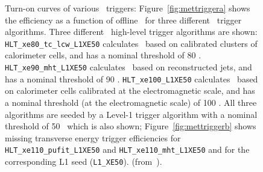 				\begin{figure}[!htb]
					\begin{center}
						\hspace{0.05\textwidth}
					\end{center}
					\caption{Turn-on curves of various \met\ triggers: Figure~\ref{fig:mettriggera} shows the efficiency as a function of offline \met\ for three different \met\ trigger algorithms. Three different \met\ high-level trigger algorithms are shown: \texttt{HLT\_xe80\_tc\_lcw\_L1XE50} calculates \met\ based on calibrated clusters of calorimeter cells, and has a nominal threshold of 80 \GeV. \texttt{HLT\_xe90\_mht\_L1XE50} calculates \met\ based on reconstructed jets, and has a nominal threshold of 90 \GeV. \texttt{HLT\_xe100\_L1XE50} calculates \met\ based on calorimeter cells calibrated at the electromagnetic scale, and has a nominal threshold (at the electromagnetic scale) of 100 \GeV. All three algorithms are seeded by a Level-1 trigger algorithm with a nominal threshold of 50 \GeV\ which is also shown; Figure~\ref{fig:mettriggerb} shows missing transverse energy trigger efficiencies for \texttt{HLT\_xe110\_pufit\_L1XE50} and \texttt{HLT\_xe110\_mht\_L1XE50} and for the corresponding \ac{L1} seed (\texttt{L1\_XE50}). (from~\cite{ATLASMETTriggerPublicPage}).}
					\label{fig:mettrigger}
				\end{figure}
